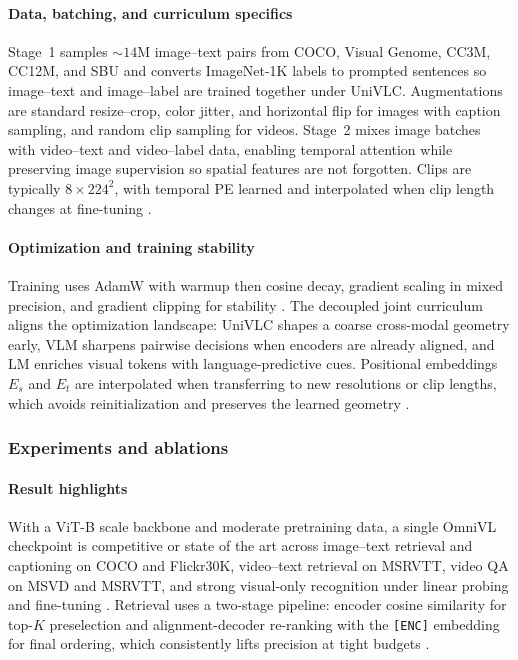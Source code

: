 \begin{enrichment}
\begin{enrichment}
        \paragraph{Data, batching, and curriculum specifics}
        Stage~1 samples \(\sim14\)M image–text pairs from COCO, Visual Genome, CC3M, CC12M, and SBU and converts ImageNet-1K labels to prompted sentences so image–text and image–label are trained together under UniVLC. Augmentations are standard resize–crop, color jitter, and horizontal flip for images with caption sampling, and random clip sampling for videos. Stage~2 mixes image batches with video–text and video–label data, enabling temporal attention while preserving image supervision so spatial features are not forgotten. Clips are typically \(8\times224^2\), with temporal PE learned and interpolated when clip length changes at fine-tuning \cite{wang2022_omnivl}.
        
        \paragraph{Optimization and training stability}
        Training uses AdamW with warmup then cosine decay, gradient scaling in mixed precision, and gradient clipping for stability \cite{wang2022_omnivl}. The decoupled joint curriculum aligns the optimization landscape: UniVLC shapes a coarse cross-modal geometry early, VLM sharpens pairwise decisions when encoders are already aligned, and LM enriches visual tokens with language-predictive cues. Positional embeddings \(E_s\) and \(E_t\) are interpolated when transferring to new resolutions or clip lengths, which avoids reinitialization and preserves the learned geometry \cite{wang2022_omnivl}.
        
        \subsubsection{Experiments and ablations}
        \label{subsubsec:chapter24_omnivl_expts}
        
        \paragraph{Result highlights}
        With a ViT-B scale backbone and moderate pretraining data, a single OmniVL checkpoint is competitive or state of the art across image–text retrieval and captioning on COCO and Flickr30K, video–text retrieval on MSRVTT, video QA on MSVD and MSRVTT, and strong visual-only recognition under linear probing and fine-tuning \cite{wang2022_omnivl}. Retrieval uses a two-stage pipeline: encoder cosine similarity for top-\(K\) preselection and alignment-decoder re-ranking with the \texttt{[ENC]} embedding for final ordering, which consistently lifts precision at tight budgets \cite{wang2022_omnivl}.
        

\end{enrichment}
\end{enrichment}
